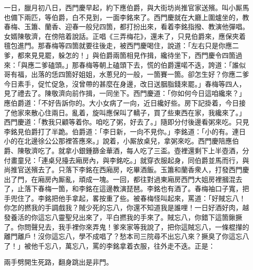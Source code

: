 一日，臘月初八日，西門慶早起，約下應伯爵，與大街坊尚推官家送殯。叫小厮馬也備下兩匹，等伯爵，白不見到，一面李銘來了。西門慶就在大廳上圍爐坐的，教春梅、玉簫、蘭香、迎春一般兒四箇，都打扮出來，看着李銘指撥、教演他彈唱。女婿陳敬濟，在傍陪着說話。正唱《三弄梅花》，還未了，只見伯爵來，應保夾着氊包進門。那春梅等四箇就要往後走，被西門慶喝住，說道：「左右只是你應二爹，都來見見罷，躲怎的！」與伯爵兩箇相見作揖，纔待坐下，西門慶令四箇過來：「與應二爹磕頭。」那春梅等朝上磕頭下去，慌的伯爵還喏不迭，誇道：「誰似哥有福，出落的恁四箇好姐姐，水蔥兒的一般，一箇賽一箇。卻怎生好？你應二爹今日素手，促忙促急，沒曾帶的甚麼在身邊，改日送胭脂錢來罷。」春梅等四人，見了禮去了。陳敬濟向前作揖，一同坐下。西門慶道：「你如何今日這咱纔來？」應伯爵道：「不好告訴你的。大小女病了一向，近日纔好些。房下記掛着，今日接了他家來散心住兩日。亂着，旋叫應保叫了轎子，買了些東西在家，我纔來了。」{}西門慶道：「教我只顧等着你。咱吃了粥，好去了。」隨即分付後邊看粥來吃。只見李銘見伯爵打了半跪。伯爵道：「李日新，一向不見你。」李銘道：「小的有。連日小的在北邊徐公公那裡答應來。」說着，小厮放桌兒，拿粥來吃。西門慶陪應伯爵、陳敬濟吃了。就拿小銀鍾篩金華酒，每人吃了三盃。壺裡還剩下上半壺酒，分付畫童兒：「連桌兒擡去廂房內，與李銘吃。」{}就穿衣服起身，同伯爵並馬而行，與尚推官送殯去了。只落下李銘在西廂房，吃畢酒飯。玉簫和蘭香衆人，打發西門慶出了門，在廂房內厮亂，頑成一塊。{}一回，都往對過東廂房西門大姐房裡摑混去了，止落下春梅一箇，和李銘在這邊教演琵琶。李銘也有酒了。春梅袖口子寬，把手兜住了。李銘把他手拿起，畧按重了些。被春梅怪叫起來，{}罵道：「好賊忘八！你怎的撚我的手調戲我？賊少死的忘八，你還不知道我是誰哩！{}一日好酒好肉，越發養活的你這忘八靈聖兒出來了，{}平白撚我的手來了。賊忘八，你錯下這箇鍬撅了。你問聲兒去，我手裡你來弄鬼！爹來家等我說了，把你這賊忘八，一條棍攆的離門離戶！沒你這忘八，學不成唱了？愁本司三院尋不出忘八來？撅臭了你這忘八了！」被他千忘八，萬忘八，罵的李銘拿着衣服，往外走不迭。正是：

\begin{myquote} 
兩手劈開生死路，翻身跳出是非門。
\end{myquote} 

